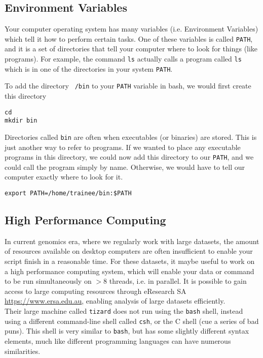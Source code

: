 \subsection{Environment Variables}
\begin{information}
Your computer operating system has many variables (i.e. Environment Variables) which tell it how to perform certain tasks.
One of these variables is called \texttt{PATH}, and it is a set of directories that tell your computer where to look for things (like programs).
For example, the command \texttt{ls} actually calls a program called \texttt{ls} which is in one of the directories in your system \texttt{PATH}.\\
\end{information}

\begin{steps}
To add the directory \texttt{~/bin} to your \texttt{PATH} variable in bash, we would first create this directory
\begin{lstlisting}
cd
mkdir bin
\end{lstlisting}
\end{steps}

\begin{steps}
Directories called \texttt{bin} are often when executables (or binaries) are stored.
This is just another way to refer to programs.
If we wanted to place any executable programs in this directory, we could now add this directory to our \texttt{PATH}, and we could call the program simply by name.
Otherwise, we would have to tell our computer exactly where to look for it.

\begin{lstlisting}
export PATH=/home/trainee/bin:$PATH
\end{lstlisting}
\end{steps}

\subsection{High Performance Computing}
\begin{information}
In current genomics era, where we regularly work with large datasets, the amount of resources available on desktop computers are often insufficient to enable your script finish in a reasonable time. 
For these datasets, it maybe useful to work on a high performance computing system, which will enable your data or command to be run simultaneously on $>8$ threads, i.e. in parallel.
It is possible to gain access to large computing resources through eResearch SA \url{https://www.ersa.edu.au}, enabling analysis of large datasets efficiently.\\ 

Their large machine called \texttt{tizard} does not run using the \texttt{bash} shell, instead using a different command-line shell called \texttt{csh}, or the C shell (cue a series of bad puns).
This shell is very similar to \texttt{bash}, but has some slightly different syntax elements, much like different programming languages can have numerous similarities.\\
\end{information}

